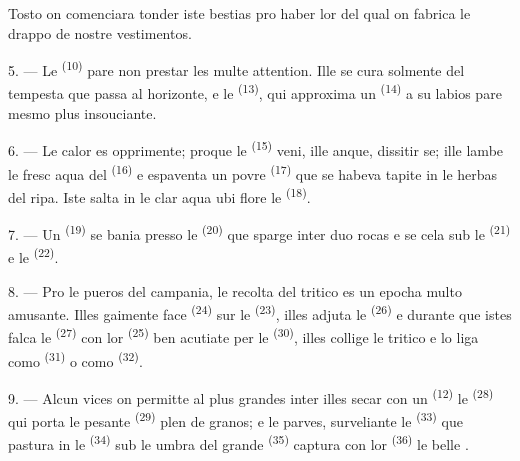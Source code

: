 Tosto on comenciara tonder iste bestias pro haber lor  del qual on
fabrica le drappo de nostre vestimentos.

\VUsaut{5.0mm}
\VUsaut{3.4mm}

5. --- Le  \textsuperscript{(10)} pare non prestar les multe
attention. Ille se cura solmente del tempesta que passa al horizonte, e le
 \textsuperscript{(13)}, qui approxima un 
\textsuperscript{(14)} a su labios pare mesmo plus insouciante.

6. --- Le calor es opprimente; proque le  \textsuperscript{(15)}
veni, ille anque, dissitir se; ille lambe le fresc aqua del 
\textsuperscript{(16)} e espaventa un povre 
\textsuperscript{(17)} que se habeva tapite in le herbas del ripa. Iste salta in
le clar aqua ubi flore le  \textsuperscript{(18)}.

7. --- Un  \textsuperscript{(19)} se bania presso le
 \textsuperscript{(20)} que sparge inter duo rocas e se cela
sub le  \textsuperscript{(21)} e le  \textsuperscript{(22)}.

\VUsaut{5.0mm}
\VUsaut{3.4mm}

8. --- Pro le pueros del campania, le recolta del tritico es un epocha multo
amusante. Illes gaimente face  \textsuperscript{(24)} sur le
 \textsuperscript{(23)}, illes adjuta le
 \textsuperscript{(26)} e durante que istes falca le
 \textsuperscript{(27)} con lor 
\textsuperscript{(25)} ben acutiate per le 
\textsuperscript{(30)}, illes collige le tritico e lo liga como 
\textsuperscript{(31)} o como  \textsuperscript{(32)}.

9. --- Alcun vices on permitte al plus grandes inter illes secar con un
 \textsuperscript{(12)} le 
\textsuperscript{(28)} qui porta le pesante 
\textsuperscript{(29)} plen de granos; e le parves, surveliante le
 \textsuperscript{(33)} que pastura in le 
\textsuperscript{(34)} sub le umbra del grande 
\textsuperscript{(35)} captura con lor  \textsuperscript{(36)} le
belle .

